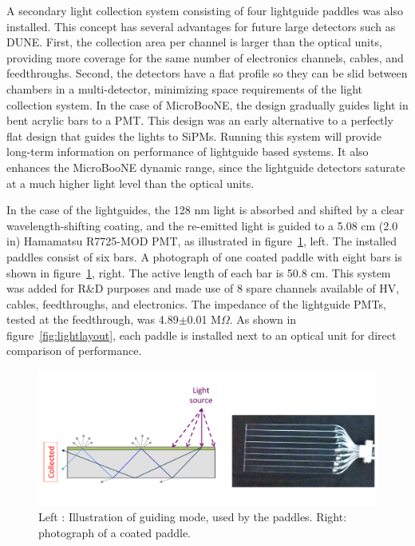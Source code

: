 A secondary light collection system consisting of four lightguide paddles was also installed.   This concept has several advantages for future large detectors such as DUNE. First, the collection area per channel is larger than the optical units, providing more coverage for the same number of electronics channels, cables, and feedthroughs.  Second, the detectors have a flat profile so they can be slid between chambers in a multi-\lartpc detector, minimizing space requirements of the light collection system.  In the case of MicroBooNE, the design gradually guides light in bent acrylic bars to a PMT.  This design was an early alternative to a perfectly flat design that guides the lights to SiPMs.  Running this system will provide long-term information on performance of lightguide based systems.  It also enhances the MicroBooNE dynamic range, since the lightguide detectors saturate at a much higher light level than the optical units.

In the case of the lightguides, the 128 nm light is absorbed and shifted by a clear wavelength-shifting coating, and the re-emitted light is guided to a 5.08 cm (2.0 in) Hamamatsu R7725-MOD PMT, as illustrated in figure~\ref{fig:LGCoating}, left. The installed paddles consist of six bars.  A photograph of one coated paddle with eight bars is shown in figure~\ref{fig:LGCoating}, right.  The active length of each bar is 50.8 cm.  This system was added for R\&D purposes and made use of 8 spare channels available of HV, cables, feedthroughs, and electronics.  The impedance of the lightguide PMTs, tested at the feedthrough, was 4.89$\pm$0.01 M$\Omega$.  As shown in figure~\ref{fig:lightlayout}, each paddle is installed next to an optical unit for direct comparison of performance.

\begin{figure}
\centering 
\includegraphics[width=\textwidth]{./figures/LightguideModeAndPhoto.pdf}
\caption{Left : Illustration of guiding mode, used by the paddles. Right: photograph of a coated paddle. \label{fig:LGCoating}}
\end{figure}



